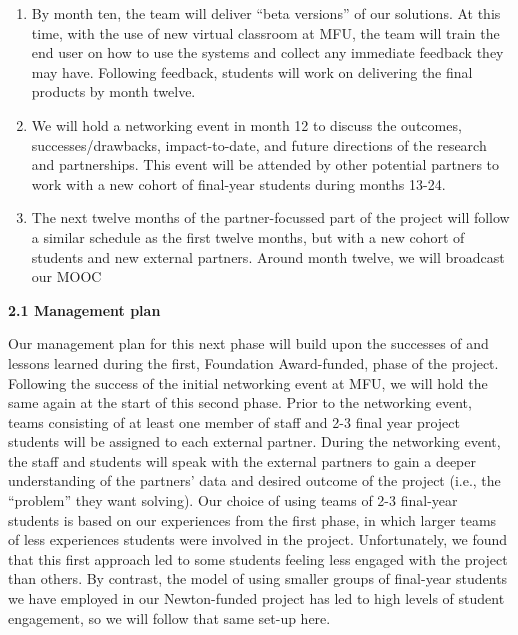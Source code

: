 \documentclass[11pt]{article}
\begin{document}
\begin{enumerate}[leftmargin=6mm,itemsep=-3pt,topsep=1pt]
  \item By month ten, the team will deliver “beta versions” of our solutions. At this time, with the use of new virtual classroom at MFU, the team will train the end user on how to use the systems and collect any immediate feedback they may have. Following feedback, students will work on delivering the final products by month twelve.
  \item We will hold a networking event in month 12 to discuss the outcomes, successes/drawbacks, impact-to-date, and future directions of the research and partnerships. This event will be attended by other potential partners to work with a new cohort of final-year students during months 13-24.
  \item The next twelve months of the partner-focussed part of the project will follow a similar schedule as the first twelve months, but with a new cohort of students and new external partners. Around month twelve, we will broadcast our MOOC
  \end{enumerate}
  
  \pagebreak

  \vspace{3mm}
  \noindent
  {\large \bf 2.1 Management plan}
    
  \noindent
  Our management plan for this next phase will build upon the successes of and lessons learned during the first, Foundation Award-funded, phase of the project. Following the success of the initial networking event at MFU, we will hold the same again at the start of this second phase. Prior to the networking event, teams consisting of at least one member of staff and 2-3 final year project students will be assigned to each external partner. During the networking event, the staff and students will speak with the external partners to gain a deeper understanding of the partners' data and desired outcome of the project (i.e., the ``problem'' they want solving). Our choice of using teams of 2-3 final-year students is based on our experiences from the first phase, in which larger teams of less experiences students were involved in the project. Unfortunately, we found that this first approach led to some students feeling less engaged with the project than others. By contrast, the model of using smaller groups of final-year students we have employed in our Newton-funded project has led to high levels of student engagement, so we will follow that same set-up here.
  
\end{document}
